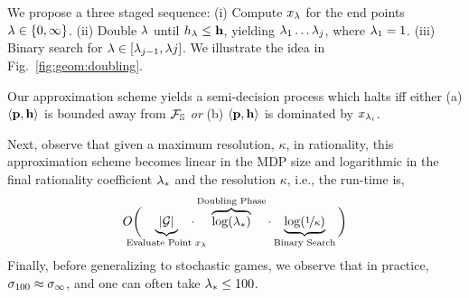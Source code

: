 We propose a three staged sequence: (i) Compute $x_\lambda$ for the end
points $\lambda \in \{0, \infty\}$.  (ii) Double $\lambda$ until $h_\lambda \leq
\mathbf{h}$, yielding $\lambda_1\ldots \lambda_j$, where $\lambda_1 = 1$.
(iii) Binary search for $\lambda \in [\lambda_{j-1}, \lambda{j}]$. We illustrate the idea in Fig.~\ref{fig:geom:doubling}.
\begin{mdframed}
  Our approximation scheme yields a semi-decision process which halts
  iff either (a) $\langle \mathbf{p}, \mathbf{h} \rangle$ is
  bounded away from $\mathcal{F}_{\mathbb{S}}$ \emph{or} (b)
  $\langle \mathbf{p}, \mathbf{h} \rangle$ is dominated by
  $x_{\lambda_i}$.
\end{mdframed}
Next, observe that given a maximum resolution, $\kappa$, in
rationality, this approximation scheme becomes linear in the MDP size
and logarithmic in the final rationality coefficient $\lambda_*$ and the
resolution $\kappa$, i.e., the run-time is,
\begin{equation}
  O\bigg(\hspace{-1.4em}\underbrace{|\sg|}_{\text{Evaluate Point $x_\rat$}}\hspace{-1.4em}\cdot\overbrace{\log(\rat_*)}^{\text{Doubling Phase}}\cdot\underbrace{\log(\nicefrac{1}{\kappa})}_{\text{Binary Search}}\bigg)
\end{equation}
Finally, before generalizing to stochastic games, we observe that in
practice, $\sigma_{100} \approx \sigma_\infty$, and one can often take
$\lambda_* \leq 100$.

